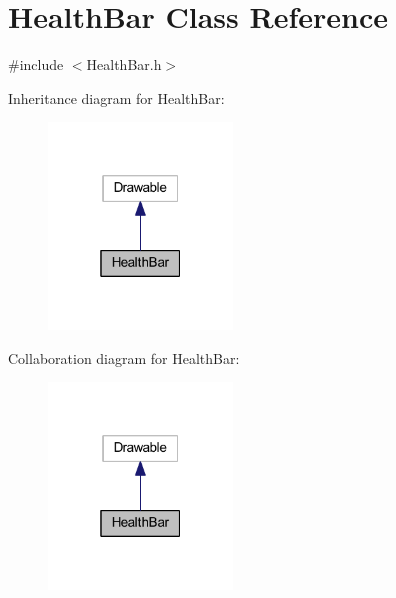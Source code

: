 \hypertarget{class_health_bar}{}\section{Health\+Bar Class Reference}
\label{class_health_bar}


{\ttfamily \#include $<$Health\+Bar.\+h$>$}



Inheritance diagram for Health\+Bar\+:
\nopagebreak
\begin{figure}[H]
\begin{center}
\leavevmode
\includegraphics[width=139pt]{class_health_bar__inherit__graph}
\end{center}
\end{figure}


Collaboration diagram for Health\+Bar\+:
\nopagebreak
\begin{figure}[H]
\begin{center}
\leavevmode
\includegraphics[width=139pt]{class_health_bar__coll__graph}
\end{center}
\end{figure}
